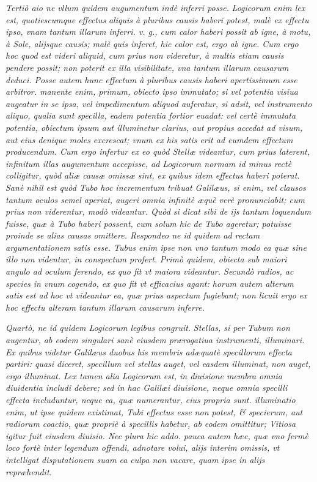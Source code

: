 \documentclass[11pt,twoside,openany]{book}
\begin{document}
\textit{Tertiò aio ne vllum quidem augumentum indè inferri posse. }\textit{Logicorum enim lex est, quotiescumque effectus }\textit{aliquis à pluribus causis haberi potest, malè ex effectu ipso, vnam tantum illarum inferri. v. g., cum calor haberi possit ab igne, à motu, à Sole, alijsque causis; malè quis inferet, hic calor est, ergo ab igne. Cum ergo hoc quod est videri aliquid, cum prius non videretur, à multis etiam causis pendere possit; non poterit ex illa visibilitate, vna tantum illarum causarum deduci. Posse autem hunc effectum à pluribus causis haberi apertissimum esse arbitror. manente enim, primum, obiecto ipso immutato; si vel potentia visiua augeatur in se ipsa, vel impedimentum aliquod auferatur, si adsit, vel instrumento aliquo, qualia sunt specilla, eadem potentia fortior euadat: vel certè immutata potentia, obiectum ipsum aut illuminetur clarius, aut propius accedat ad visum, aut eius denique moles excrescat; vnum ex his satis erit ad eumdem effectum producendum. Cum ergo infertur ex eo quòd Stellæ videantur, cum prius laterent, infinitum illas augumentum accepisse, ad Logicorum normam id minus rectè colligitur, quòd aliæ causæ omissæ sint, ex quibus idem effectus haberi poterat. Sanè nihil est quòd Tubo hoc incrementum tribuat Galilæus, si enim, vel clausos tantum oculos semel aperiat, augeri omnia infinitè æquè verè pronunciabit; cum prius non viderentur, modò videantur. Quòd si dicat sibi de ijs tantum loquendum fuisse, quæ à Tubo haberi possent, cum solum hic de Tubo ageretur; potuisse proinde se alias causas omittere. Respondeo ne id quidem ad rectam argumentationem satis esse. Tubus enim ipse non vno tantum modo ea quæ sine illo non videntur, in conspectum profert. }\textit{Primò quidem, obiecta sub maiori angulo ad oculum ferendo, ex quo fit vt maiora videantur. Secundò radios, ac species in vnum cogendo, ex quo fit vt efficacius agant: horum autem alterum satis est ad }\textit{hoc vt videantur ea, quæ prius aspectum fugiebant; non licuit ergo ex hoc effectu alteram tantum illarum causarum inferre.}


\textit{Quartò, ne id quidem Logicorum legibus congruit. }\textit{Stellas, si per Tubum non augentur, ab eodem singulari sanè eiusdem prærogatiua instrumenti, illuminari. Ex quibus videtur Galilæus duobus his membris adæquatè specillorum effecta partiri: quasi diceret, specillum vel stellas auget, vel easdem illuminat, non auget, ergo illuminat. Lex tamen alia Logicorum est, in diuisione membra omnia diuidentia includi debere; sed in hac Galilæi diuisione, neque omnia specilli effecta includuntur, neque ea, quæ numerantur, eius propria sunt. illuminatio enim, ut ipse quidem existimat, Tubi effectus esse non potest, \& specierum, aut radiorum coactio, quæ propriè à specillis habetur, ab eodem omittitur; Vitiosa igitur fuit eiusdem diuisio. Nec plura hic addo. pauca autem hæc, quæ vno fermè loco fortè inter legendum offendi, adnotare volui, alijs interim omissis, vt intelligat disputationem suam ea culpa non vacare, quam ipse in alijs repræhendit.}
\end{document}
